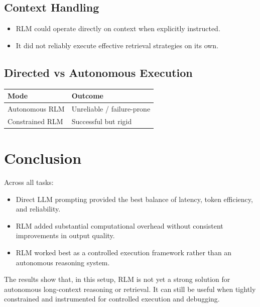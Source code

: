 \documentclass{article}
\begin{document}
\subsection{Context Handling}

\begin{itemize}
    \item RLM could operate directly on context when explicitly instructed.
    \item It did not reliably execute effective retrieval strategies on its own.
\end{itemize}

\subsection{Directed vs Autonomous Execution}

\begin{center}
\begin{tabular}{|l|l|}
\hline
Mode & Outcome \\
\hline
Autonomous RLM & Unreliable / failure-prone \\
Constrained RLM & Successful but rigid \\
\hline
\end{tabular}
\end{center}

\section{Conclusion}

Across all tasks:

\begin{itemize}
    \item Direct LLM prompting provided the best balance of latency, token efficiency, and reliability.
    \item RLM added substantial computational overhead without consistent improvements in output quality.
    \item RLM worked best as a controlled execution framework rather than an autonomous reasoning system.
\end{itemize}

The results show that, in this setup, RLM is not yet a strong solution for autonomous long-context reasoning or retrieval. It can still be useful when tightly constrained and instrumented for controlled execution and debugging.
\end{document}
